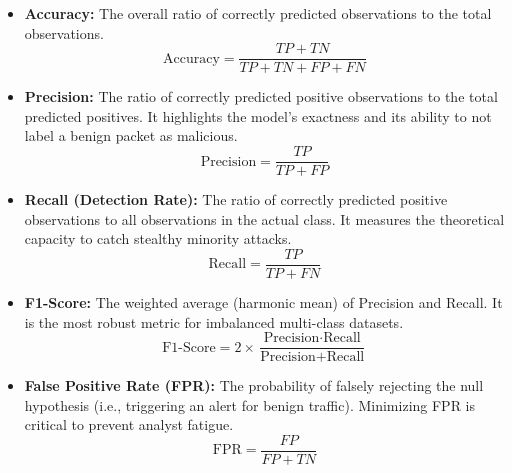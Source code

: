 \begin{itemize}
    \item \textbf{Accuracy:} The overall ratio of correctly predicted observations to the total observations.
    \begin{equation}
        \text{Accuracy} = \frac{TP + TN}{TP + TN + FP + FN}
    \end{equation}

    \item \textbf{Precision:} The ratio of correctly predicted positive observations to the total predicted positives. It highlights the model's exactness and its ability to not label a benign packet as malicious.
    \begin{equation}
        \text{Precision} = \frac{TP}{TP + FP}
    \end{equation}

    \item \textbf{Recall (Detection Rate):} The ratio of correctly predicted positive observations to all observations in the actual class. It measures the theoretical capacity to catch stealthy minority attacks.
    \begin{equation}
        \text{Recall} = \frac{TP}{TP + FN}
    \end{equation}

    \item \textbf{F1-Score:} The weighted average (harmonic mean) of Precision and Recall. It is the most robust metric for imbalanced multi-class datasets.
    \begin{equation}
        \text{F1-Score} = 2 \times \frac{\text{Precision} \cdot \text{Recall}}{\text{Precision} + \text{Recall}}
    \end{equation}

    \item \textbf{False Positive Rate (FPR):} The probability of falsely rejecting the null hypothesis (i.e., triggering an alert for benign traffic). Minimizing FPR is critical to prevent analyst fatigue.
    \begin{equation}
        \text{FPR} = \frac{FP}{FP + TN}
    \end{equation}
\end{itemize}

